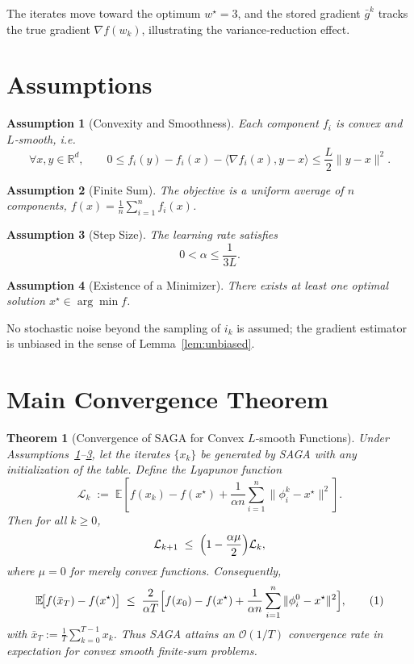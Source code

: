\documentclass{article}
\newtheorem{theorem}{Theorem}[section]
\newtheorem{assumption}{Assumption}[section]
\begin{document}
The iterates move toward the optimum $w^\star=3$, and the stored gradient $\bar g^k$ tracks the true gradient $\nabla f(w_k)$, illustrating the variance‑reduction effect.

\section{Assumptions}
\label{sec:assumptions}
\begin{assumption}[Convexity and Smoothness]\label{ass:conv-smooth}
Each component $f_i$ is convex and $L$‑smooth, i.e.
\[
\forall x,y\in\mathbb{R}^d,\qquad
0\le f_i(y)-f_i(x)-\langle\nabla f_i(x),y-x\rangle\le\frac{L}{2}\|y-x\|^{2}.
\]
\end{assumption}

\begin{assumption}[Finite Sum]\label{ass:finite}
The objective is a uniform average of $n$ components,
$f(x)=\frac1n\sum_{i=1}^{n}f_i(x)$.
\end{assumption}

\begin{assumption}[Step Size]\label{ass:step}
The learning rate satisfies
\[
0<\alpha\le\frac{1}{3L}.
\]
\end{assumption}

\begin{assumption}[Existence of a Minimizer]\label{ass:opt}
There exists at least one optimal solution $x^\star\in\arg\min f$.
\end{assumption}

No stochastic noise beyond the sampling of $i_k$ is assumed; the gradient estimator is unbiased in the sense of Lemma~\ref{lem:unbiased}.

\section{Main Convergence Theorem}
\begin{theorem}[Convergence of SAGA for Convex $L$‑smooth Functions]\label{thm:convex}
Under Assumptions~\ref{ass:conv-smooth}--\ref{ass:step}, let the iterates $\{x_k\}$ be generated by SAGA with any initialization of the table. Define the Lyapunov function
\[
\mathcal{L}_k \;:=\; \mathbb{E}\!\left[ f(x_k)-f(x^\star)
      +\frac{1}{\alpha n}\sum_{i=1}^{n}\| \phi_i^{k}-x^\star\|^{2}\right].
\]
Then for all $k\ge0$,
\[
\mathcal{L}_{k+1}\;\le\;\Bigl(1-\frac{\alpha\mu}{2}\Bigr)\mathcal{L}_{k},
\]
where $\mu=0$ for merely convex functions. Consequently,
\[
\mathbb{E}\!\bigl[f(\bar x_T)-f(x^\star)\bigr]\;\le\;
\frac{2}{\alpha T}\Bigl[f(x_0)-f(x^\star)
      +\frac{1}{\alpha n}\sum_{i=1}^{n}\|\phi_i^{0}-x^\star\|^{2}\Bigr],
\tag{1}
\]
with $\bar x_T:=\frac{1}{T}\sum_{k=0}^{T-1}x_k$.
Thus SAGA attains an $\mathcal{O}(1/T)$ convergence rate in expectation for convex smooth finite‑sum problems.
\end{theorem}
\end{document}
